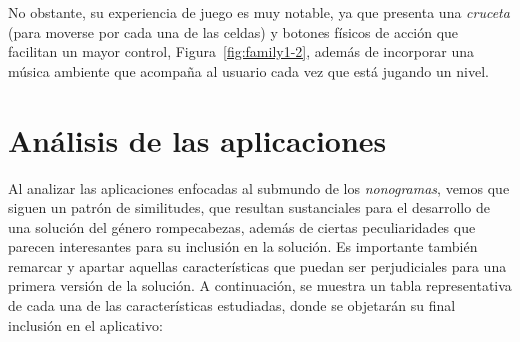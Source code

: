 No obstante, su experiencia de juego es muy notable, ya que presenta una \textit{cruceta} (para moverse por cada una de las celdas) 
y botones físicos de acción que facilitan un mayor control,
Figura~\ref{fig:family1-2}, además de incorporar una música ambiente que acompaña al usuario cada vez que  está jugando un nivel.

\section{Análisis de las aplicaciones}

Al analizar las aplicaciones enfocadas al submundo de los \textit{nonogramas}, vemos que siguen un patrón de similitudes, que resultan sustanciales 
para el desarrollo de una solución del género rompecabezas, además de ciertas peculiaridades que parecen interesantes para su inclusión en la solución.
Es importante también remarcar y apartar aquellas características que puedan ser perjudiciales para una primera versión de la solución.
A continuación, se muestra un tabla representativa de cada una de las características estudiadas, donde se objetarán su final inclusión en el aplicativo:

